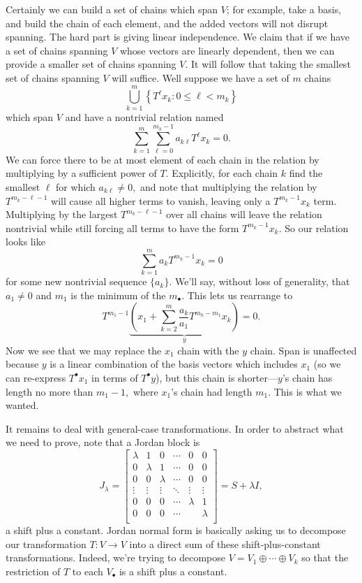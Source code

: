 Certainly we can build a set of chains which span $V$; for example, take a basis, and build the chain of each element, and the added vectors will not disrupt spanning. The hard part is giving linear independence. We claim that if we have a set of chains spanning $V$ whose vectors are linearly dependent, then we can provide a smaller set of chains spanning $V.$ It will follow that taking the smallest set of chains spanning $V$ will suffice. Well suppose we have a set of $m$ chains
\[\bigcup_{k=1}^m\left\{T^\ell x_k:0\le \ell<m_k\right\}\]
which span $V$ and have a nontrivial relation named
\[\sum_{k=1}^m\sum_{\ell=0}^{m_k-1}a_{k\ell}T^\ell x_k=0.\]
We can force there to be at most element of each chain in the relation by multiplying by a sufficient power of $T.$ Explicitly, for each chain $k$ find the smallest $\ell$ for which $a_{k\ell}\ne0,$ and note that multiplying the relation by $T^{m_k-\ell-1}$ will cause all higher terms to vanish, leaving only a $T^{m_k-1}x_k$ term. Multiplying by the largest $T^{m_k-\ell-1}$ over all chains will leave the relation nontrivial while still forcing all terms to have the form $T^{m_k-1}x_k.$ So our relation looks like
\[\sum_{k=1}^ma_kT^{m_k-1}x_k=0\]
for some new nontrivial sequence $\{a_k\}.$ We'll say, without loss of generality, that $a_1\ne0$ and $m_1$ is the minimum of the $m_\bullet.$ This lets us rearrange to
\[T^{m_1-1}\underbrace{\left(x_1+\sum_{k=2}^m\frac{a_k}{a_1}T^{m_k-m_1}x_k\right)}_y=0.\]
Now we see that we may replace the $x_1$ chain with the $y$ chain. Span is unaffected because $y$ is a linear combination of the basis vectors which includes $x_1$ (so we can re-express $T^\bullet x_1$ in terms of $T^\bullet y$), but this chain is shorter---$y$'s chain has length no more than $m_1-1,$ where $x_1$'s chain had length $m_1.$ This is what we wanted.

It remains to deal with general-case transformations. In order to abstract what we need to prove, note that a Jordan block is
\[J_\lambda=\begin{bmatrix}
    \lambda & 1 & 0 & \cdots & 0 & 0 \\
    0 & \lambda & 1 & \cdots & 0 & 0 \\
    0 & 0 & \lambda & \cdots & 0 & 0 \\
    \vdots & \vdots & \vdots & \ddots & \vdots & \vdots \\
    0 & 0 & 0 & \cdots & \lambda & 1 \\
    0 & 0 & 0 & \cdots & & \lambda \\
\end{bmatrix}=S+\lambda I,\]
a shift plus a constant. Jordan normal form is basically asking us to decompose our transformation $T:V\to V$ into a direct sum of these shift-plus-constant transformations. Indeed, we're trying to decompose $V=V_1\oplus\cdots\oplus V_k$ so that the restriction of $T$ to each $V_\bullet$ is a shift plus a constant.

